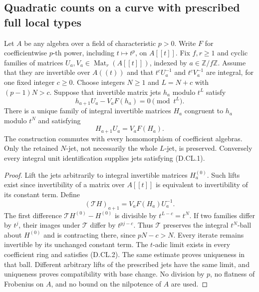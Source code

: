 \subsection{Quadratic counts on a curve with prescribed full local types}

\begin{lemma}
\label{D:curve-integral-unit-jet-comparison}
Let $A$ be any algebra over a field of characteristic $p>0$.
Write $F$ for coefficientwise $p$-th power, including $t\mapsto t^p$,
on $A[[t]]$. Fix $f,r\geq1$ and cyclic families of matrices
$U_a,V_a\in\operatorname{Mat}_r(A[[t]])$, indexed by
$a\in\mathbb Z/f\mathbb Z$. Assume that they are invertible over
$A((t))$ and that $t^cU_a^{-1}$ and $t^cV_a^{-1}$ are integral,
for one fixed integer $c\geq0$.
Choose integers $N\geq1$ and $L=N+c$ with $(p-1)N>c$.
Suppose that invertible matrix jets $h_a$ modulo $t^L$ satisfy
\[
 h_{a+1}U_a-V_aF(h_a)=0\pmod {t^L}.
 \tag{D.CL.1}
\]
There is a unique family of integral invertible matrices $H_a$
congruent to $h_a$ modulo $t^N$ and satisfying
\[
                  H_{a+1}U_a=V_aF(H_a).
 \tag{D.CL.2}
\]
The construction commutes with every homomorphism of coefficient
algebras. Only the retained $N$-jet, not necessarily the whole
$L$-jet, is preserved. Conversely every integral unit identification
supplies jets satisfying (D.CL.1).
\end{lemma}

\begin{proof}
Lift the jets arbitrarily to integral invertible matrices $H^{(0)}_a$.
Such lifts exist since invertibility of a matrix over $A[[t]]$ is
equivalent to invertibility of its constant term. Define
\[
 (\mathcal T H)_{a+1}=V_aF(H_a)U_a^{-1}.
 \tag{D.CL.3}
\]
The first difference $\mathcal T H^{(0)}-H^{(0)}$ is divisible by
$t^{L-c}=t^N$. If two families differ by $t^j$, their images under
$\mathcal T$ differ by $t^{pj-c}$. Thus $\mathcal T$ preserves
the integral $t^N$-ball about $H^{(0)}$ and is contracting there,
since $pN-c>N$. Every iterate remains invertible by its unchanged
constant term. The $t$-adic limit exists in every coefficient ring
and satisfies (D.CL.2). The same estimate proves uniqueness in
that ball. Different arbitrary lifts of the prescribed jets have
the same limit, and uniqueness proves compatibility with base
change. No division by $p$, no flatness of Frobenius on $A$, and
no bound on the nilpotence of $A$ are used.
\end{proof}

